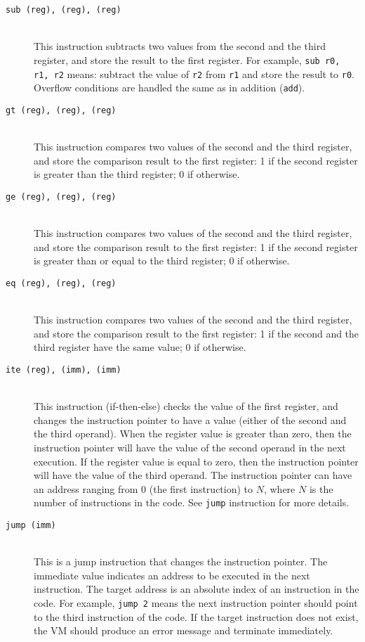 \documentclass[a4paper, 11pt]{article}
\theoremstyle{definition}
\begin{document}
{\begin{description}
  \item [\texttt{sub (reg), (reg), (reg)}]~\\
    This instruction subtracts two values from the second and the
    third register, and store the result to the first register. For
    example, \texttt{sub r0, r1, r2} means: subtract the value of
    \texttt{r2} from \texttt{r1} and store the result to \texttt{r0}.
    Overflow conditions are handled the same as in addition
    (\texttt{add}).

  \item [\texttt{gt (reg), (reg), (reg)}]~\\
    This instruction compares two values of the second and
    the third register, and store the comparison result to the first
    register: 1 if the second register is greater than the third
    register; 0 if otherwise.

  \item [\texttt{ge (reg), (reg), (reg)}]~\\
    This instruction compares two values of the second and
    the third register, and store the comparison result to the first
    register: 1 if the second register is greater than or equal to the
    third register; 0 if otherwise.

  \item [\texttt{eq (reg), (reg), (reg)}]~\\
    This instruction compares two values of the second and
    the third register, and store the comparison result to the first
    register: 1 if the second and the third register have the same
    value; 0 if otherwise.

  \item [\texttt{ite (reg), (imm), (imm)}]~\\
    This instruction (if-then-else) checks the value of the first
    register, and changes the instruction pointer to have a value
    (either of the second and the third operand). When the register
    value is greater than zero, then the instruction pointer will have
    the value of the second operand in the next execution. If the
    register value is equal to zero, then the instruction pointer will
    have the value of the third operand. The instruction pointer can
    have an address ranging from 0 (the first instruction) to $N$,
    where $N$ is the number of instructions in the code. See
    \texttt{jump} instruction for more details.

  \item [\texttt{jump (imm)}]~\\
    This is a jump instruction that changes the instruction pointer.
    The immediate value indicates an address to be executed in the
    next instruction. The target address is an absolute index of an
    instruction in the code. For example, \texttt{jump 2} means the
    next instruction pointer should point to the third instruction of
    the code. If the target instruction does not exist, the VM should
    produce an error message and terminate immediately.


\end{description}}
\end{document}
